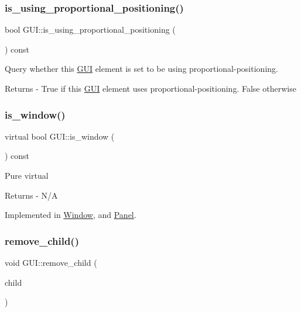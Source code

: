 \subsubsection{\texorpdfstring{is\+\_\+using\+\_\+proportional\+\_\+positioning()}{is\_using\_proportional\_positioning()}}
{\footnotesize\ttfamily bool G\+U\+I\+::is\+\_\+using\+\_\+proportional\+\_\+positioning (\begin{DoxyParamCaption}{ }\end{DoxyParamCaption}) const}

Query whether this \mbox{\hyperlink{class_g_u_i}{G\+UI}} element is set to be using proportional-\/positioning. \begin{DoxyReturn}{Returns}
-\/ True if this \mbox{\hyperlink{class_g_u_i}{G\+UI}} element uses proportional-\/positioning. False otherwise 
\end{DoxyReturn}
\mbox{\label{class_g_u_i_a7ef5287aaa630a8d1146f0d5a35b6683}} 
\subsubsection{\texorpdfstring{is\+\_\+window()}{is\_window()}}
{\footnotesize\ttfamily virtual bool G\+U\+I\+::is\+\_\+window (\begin{DoxyParamCaption}{ }\end{DoxyParamCaption}) const\hspace{0.3cm}{\ttfamily [pure virtual]}}

Pure virtual \begin{DoxyReturn}{Returns}
-\/ N/A 
\end{DoxyReturn}


Implemented in \mbox{\hyperlink{class_window_a43a34a3321d0a9bd30dbba747af14c6a}{Window}}, and \mbox{\hyperlink{class_panel_a9a30fff40fad1f0845c0c7aa2786f772}{Panel}}.

\mbox{\label{class_g_u_i_a8db69179e2a985c144c94803eddb245e}} 
\subsubsection{\texorpdfstring{remove\+\_\+child()}{remove\_child()}}
{\footnotesize\ttfamily void G\+U\+I\+::remove\+\_\+child (\begin{DoxyParamCaption}\item[{\mbox{\hyperlink{class_g_u_i}{G\+UI}} $\ast$}]{child }\end{DoxyParamCaption})}

